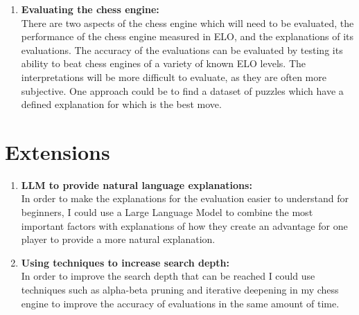 \documentclass[12pt,a4paper]{article}
\begin{document}
\begin{enumerate}

    
    \item \textbf{Evaluating the chess engine:}
    \\There are two aspects of the chess engine which will need to be evaluated, the performance of the chess engine measured in ELO, and the explanations of its evaluations. The accuracy of the evaluations can be evaluated by testing its ability to beat chess engines of a variety of known ELO levels. The interpretations will be more difficult to evaluate, as they are often more subjective. One approach could be to find a dataset of puzzles which have a defined explanation for which is the best move.

\end{enumerate}

\section*{Extensions}
\begin{enumerate}
    \item \textbf{LLM to provide natural language explanations:}
    \\In order to make the explanations for the evaluation easier to understand for beginners, I could use a Large Language Model to combine the most important factors with explanations of how they create an advantage for one player to provide a more natural explanation.
    \item \textbf{Using techniques to increase search depth:}
    \\In order to improve the search depth that can be reached I could use techniques such as alpha-beta pruning and iterative deepening in my chess engine to improve the accuracy of evaluations in the same amount of time.
\end{enumerate}
\end{document}
